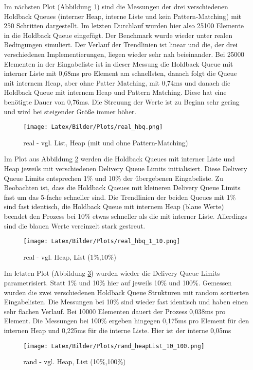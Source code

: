 Im nächsten Plot (Abbildung \ref{fig:real_hbqAll}) sind die Messungen der drei verschiedenen Holdback Queues (interner Heap, interne Liste und kein Pattern-Matching) mit 250 Schritten dargestellt. Im letzten Durchlauf wurden hier also 25100 Elemente in die Holdback Queue eingefügt. Der Benchmark wurde wieder unter realen Bedingungen simuliert. Der Verlauf der Trendlinien ist linear und die, der drei verschiedenen Implementierungen, liegen wieder sehr nah beieinander. Bei 25000 Elementen in der Eingabeliste ist in dieser Messung die Holdback Queue mit interner Liste mit 0,68ms pro Element am schnellsten, danach folgt die Queue mit internem Heap, aber ohne Patter Matching, mit 0,74ms und danach die Holdback Queue mit internem Heap und Pattern Matching. Diese hat eine benötigte Dauer von 0,76ms. Die Streuung der Werte ist zu Beginn sehr gering und wird bei steigender Größe immer höher.

\begin{figure}[htbp]
\begin{center}
\texttt{[image: Latex/Bilder/Plots/real\_hbq.png]}
\caption{\label{fig:real_hbqAll} real - vgl. List, Heap (mit und ohne Pattern-Matching)} 
\end{center}
\end{figure}

Im Plot aus Abbildung \ref{fig:real_heapListPercent} werden die Holdback Queues mit interner Liste und Heap jeweils mit verschiedenen Delivery Queue Limits initialisiert. Diese Delivery Queue Limits entsprechen 1\% und 10\% der übergebenen Eingabeliste. Zu Beobachten ist, dass die Holdback Queues mit kleineren Delivery Queue Limits fast um das 5-fache schneller sind. Die Trendlinien der beiden Queues mit 1\% sind fast identisch, die Holdback Queue mit internem Heap (blaue Werte) beendet den Prozess bei 10\% etwas schneller als die mit interner Liste. Allerdings sind die blauen Werte vereinzelt stark gestreut. 

\begin{figure}[htbp]
\begin{center}
\texttt{[image: Latex/Bilder/Plots/real\_hbq\_1\_10.png]}
\caption{\label{fig:real_heapListPercent} real - vgl. Heap, List (1\%,10\%)} 
\end{center}
\end{figure}

\newpage
Im letzten Plot (Abbildung \ref{fig:rand_heapListPercent}) wurden wieder die Delivery Queue Limits parametrisiert. Statt 1\% und 10\% hier auf jeweils 10\% und 100\%. Gemessen wurden die zwei verschiedenen Holdback Queue Strukturen mit random sortierten Eingabelisten. Die Messungen bei 10\% sind wieder fast identisch und haben einen sehr flachen Verlauf. Bei 10000 Elementen dauert der Prozess 0,038ms pro Element. Die Messungen bei 100\% ergeben hingegen 0,175ms pro Element für den internen Heap und 0,225ms für die interne Liste. Hier ist der interne 0,05ms

\begin{figure}[htbp]
\begin{center}
\texttt{[image: Latex/Bilder/Plots/rand\_heapList\_10\_100.png]}
\caption{\label{fig:rand_heapListPercent} rand - vgl. Heap, List (10\%,100\%)} 
\end{center}
\end{figure}